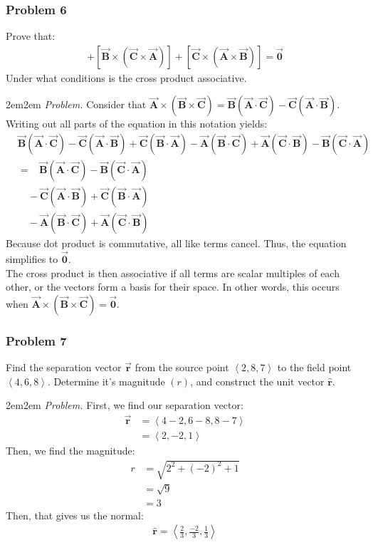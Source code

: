 \documentclass[10pt,oneside]{book}
\newcommand{\gspc}{\vspace{0.13cm}} %
\newcommand{\gline}[0]{\gspc\\} %
\let\endoldproof\endproof
\newenvironment{problem}[1]
  {\vspace{-0.1cm}\begin{coloredadjust}\begin{adjustwidth}{2em}{2em}
   \textit{Problem. }#1}
  {\endoldproof
\end{adjustwidth}\end{coloredadjust}\gspc}
\newcommand{\vA}{\vec{\mathbf{A}}}
\newcommand{\vB}{\vec{\mathbf{B}}}
\newcommand{\vC}{\vec{\mathbf{C}}}
\newcommand{\vZ}{\vec{\mathbf{0}}}
\newcommand{\pvec}[1]{\left\langle#1\right\rangle}
\newcommand{\ar}{\vec{\mathbf{r}}}
\newcommand{\arhat}{\hat{\mathbf{r}}}
\begin{document}
\subsubsection*{Problem 6}
Prove that:
\begin{align*}
  [\vA\times(\vB\times\vC)]+[\vB\times(\vC\times\vA)]+[\vC\times(\vA\times\vB)] = \vZ
\end{align*}
Under what conditions is the cross product associative. 
\begin{problem}
  Consider that $\vA\times(\vB\times\vC)=\vB(\vA\cdot\vC)-\vC(\vA\cdot\vB)$. Writing out all parts of the equation in this notation yields:
  \begin{align*}
    &\vB(\vA\cdot\vC)-\vC(\vA\cdot\vB) + \vC(\vB\cdot\vA)-\vA(\vB\cdot\vC) + \vA(\vC\cdot\vB)-\vB(\vC\cdot\vA)\\
    &=\;\;\;\vB(\vA\cdot\vC)-\vB(\vC\cdot\vA)\\
    &\quad-\vC(\vA\cdot\vB)+ \vC(\vB\cdot\vA)\\
    &\quad-\vA(\vB\cdot\vC) + \vA(\vC\cdot\vB)
  \end{align*}
  Because dot product is commutative, all like terms cancel. Thus, the equation simplifies to $\vZ$. \gline
  The cross product is then associative if all terms are scalar multiples of each other, or the vectors form a basis for their space. In other words, this occurs when $\vA \times (\vB \times \vC) = \vZ$. 
\end{problem}
\subsubsection*{Problem 7}
Find the separation vector $\ar$ from the source point $\pvec{2, 8, 7}$ to the field point $\pvec{4, 6, 8}$. Determine it's magnitude $(r)$, and construct the unit vector $\arhat$. 
\begin{problem}
  First, we find our separation vector:
  \begin{align*}
    \ar &= \pvec{4 - 2, 6 -8 , 8-7}\\
    &= \pvec{2, -2, 1}
  \end{align*}
  Then, we find the magnitude:
  \begin{align*}
    r&= \sqrt{2^2 + (-2)^2 + 1}\\
    &= \sqrt{9}\\
    &= 3
  \end{align*}
  Then, that gives us the normal:
  \begin{align*}
    \arhat = \pvec{\frac{2}3, \frac{-2}3, \frac{1}3}
  \end{align*}
\end{problem}
\end{document}
